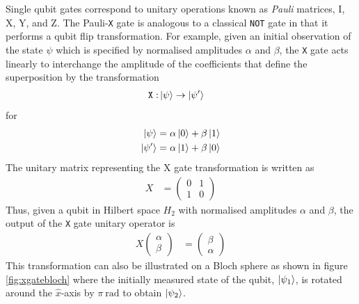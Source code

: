 Single qubit gates correspond to unitary operations known as \textit{Pauli} matrices, I, X, Y, and Z. The Pauli-\texttt{X} gate is analogous to a classical \texttt{NOT} gate in that it performs a qubit flip transformation. For example, given an initial observation of the state $\psi$ which is specified by normalised amplitudes $\alpha$ and $\beta$, the \texttt{X} gate acts linearly to interchange the amplitude of the coefficients that define the superposition by the transformation
\begin{align}
	\texttt{X}: & \ket{\psi}\rightarrow\ket{\psi'}
\end{align}
for 
\begin{align}
	\ket{\psi} & = \alpha\ket{0} + \beta\ket{1}\nonumber\\
	\ket{\psi'} & = \alpha\ket{1} + \beta\ket{0}
\end{align}
The unitary matrix representing the X gate transformation is written as
\begin{align}
	X	& = \left(\begin{matrix}
		0 & 1\\
		1 & 0
	\end{matrix}\right)
\end{align}
Thus, given a qubit in Hilbert space $H_2$ with normalised amplitudes $\alpha$ and $\beta$, the output of the \texttt{X} gate unitary operator is
\begin{align}
	X	\left(\begin{matrix}
	\alpha\\
	\beta
\end{matrix}\right) & = 
\left(\begin{matrix}
	\beta\\
	\alpha
\end{matrix}\right)
\end{align}
This transformation can also be illustrated on a Bloch sphere as shown in figure \ref{fig:xgatebloch} where the initially measured state of the qubit, $\ket{\psi_1}$, is rotated around the $\hat{x}$-axis by $\pi~\si{\radian}$ to obtain $\ket{\psi_2}$. 
